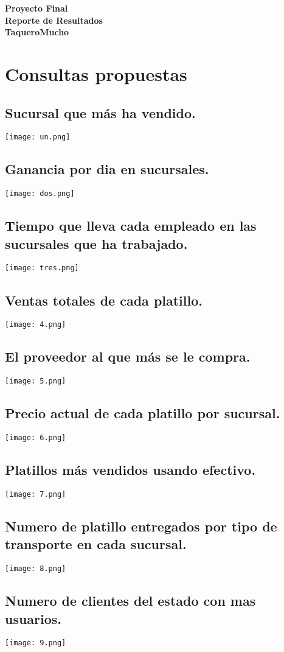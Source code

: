 \documentclass[11pt]{article}
\begin{document}
\begin{center}
	\LARGE{\textbf{Proyecto Final\\Reporte de Resultados\\TaqueroMucho}}
\end{center}

\section{Consultas propuestas }
\subsection{Sucursal que más ha vendido.}
\texttt{[image: un.png]}
\subsection{Ganancia por dia en sucursales.}
\texttt{[image: dos.png]}
\subsection{Tiempo que lleva cada empleado en las sucursales que ha trabajado.}
\texttt{[image: tres.png]}
\subsection{Ventas totales de cada platillo.}
\texttt{[image: 4.png]}
\subsection{El proveedor al que más se le compra.}
\texttt{[image: 5.png]}
\subsection{Precio actual de cada platillo por sucursal.}
\texttt{[image: 6.png]}
\subsection{Platillos más vendidos usando efectivo.}
\texttt{[image: 7.png]}
\subsection{Numero de platillo entregados por tipo de transporte en cada sucursal.}
\texttt{[image: 8.png]}
\subsection{Numero de clientes del estado con mas usuarios.}
\texttt{[image: 9.png]}
\end{document}
